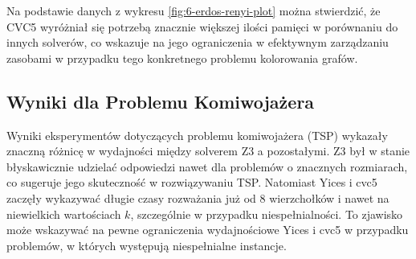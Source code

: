 Na podstawie danych z wykresu \ref{fig:6-erdos-renyi-plot} można stwierdzić, że CVC5 wyróżniał się potrzebą znacznie większej ilości pamięci w porównaniu do innych solverów, co wskazuje na jego ograniczenia w efektywnym zarządzaniu zasobami w przypadku tego konkretnego problemu kolorowania grafów.

\subsection{Wyniki dla Problemu Komiwojażera}

Wyniki eksperymentów dotyczących problemu komiwojażera (TSP) wykazały znaczną różnicę w wydajności między solverem Z3 a pozostałymi. Z3 był w stanie błyskawicznie udzielać odpowiedzi nawet dla problemów o znacznych rozmiarach, co sugeruje jego skuteczność w rozwiązywaniu TSP. Natomiast Yices i cvc5 zaczęły wykazywać długie czasy rozważania już od 8 wierzchołków i nawet na niewielkich wartościach $k$, szczególnie w przypadku niespełnialności. To zjawisko może wskazywać na pewne ograniczenia wydajnościowe Yices i cvc5 w przypadku problemów, w których występują niespełnialne instancje.

